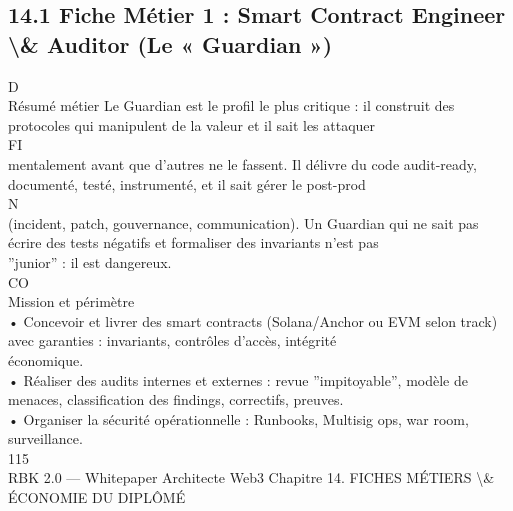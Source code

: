 \documentclass[12pt,landscape,a4paper]{article}
\begin{document}
\subsection{14.1 Fiche Métier 1 : Smart Contract Engineer \textbackslash{}& Auditor (Le « Guardian »)}
\vspace{0.5em}
\vspace{0.5em}
\vspace{0.5em}
\vspace{0.5em}
D\\
Résumé métier Le Guardian est le profil le plus critique : il construit des protocoles qui manipulent de la valeur et il sait les attaquer\\
\vspace{0.5em}
\vspace{0.5em}
\vspace{0.5em}
\vspace{0.5em}
FI\\
mentalement avant que d’autres ne le fassent. Il délivre du code audit-ready, documenté, testé, instrumenté, et il sait gérer le post-prod\\
\vspace{0.5em}
N\\
(incident, patch, gouvernance, communication). Un Guardian qui ne sait pas écrire des tests négatifs et formaliser des invariants n’est pas\\
”junior” : il est dangereux.\\
CO\\
Mission et périmètre\\
\vspace{0.5em}
• Concevoir et livrer des smart contracts (Solana/Anchor ou EVM selon track) avec garanties : invariants, contrôles d’accès, intégrité\\
économique.\\
\vspace{0.5em}
• Réaliser des audits internes et externes : revue ”impitoyable”, modèle de menaces, classification des findings, correctifs, preuves.\\
\vspace{0.5em}
• Organiser la sécurité opérationnelle : Runbooks, Multisig ops, war room, surveillance.\\
\vspace{0.5em}
\vspace{0.5em}
\vspace{0.5em}
\vspace{0.5em}
115\\
RBK 2.0 — Whitepaper Architecte Web3                                                               Chapitre 14. FICHES MÉTIERS \textbackslash{}& ÉCONOMIE DU DIPLÔMÉ\\
\end{document}
